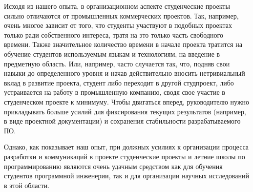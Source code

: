 \documentclass[a4paper]{article}
\begin{document}
Исходя из нашего опыта, в организационном аспекте студенческие проекты сильно отличаются от промышленных коммерческих проектов. Так, например, очень многое зависит от того, что студенты участвуют в подобных проектах только ради собственного интереса, тратя на это только часть свободного времени. Также значительное количество времени в начале проекта тратится на обучение студентов используемым языкам и технологиям, на введение в предметную область. Или, например, часто случается так, что, подняв свои навыки до определенного уровня и начав действительно вносить нетривиальный вклад в развитие проекта, студент либо переходит в другой студпроект, либо устраивается на работу в промышленную компанию, сводя свое участие в студенческом проекте к минимуму. Чтобы двигаться вперед, руководителю нужно прикладывать больше усилий для фиксирования текущих результатов (например, в виде проектной документации) и сохранения стабильности разрабатываемого ПО. 

Однако, как показывает наш опыт, при должных усилиях к организации процесса разработки и коммуникаций в проекте студенческие проекты и летние школы по программированию являются очень удачным средством как для обучения студентов программной инженерии, так и для организации научных исследований в этой области. 
\end{document}
